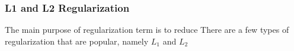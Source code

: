 \subsubsection{L1 and L2 Regularization}

The main purpose of regularization term is to reduce There are a few types of regularization that are popular, namely $L_1$ and $L_2$